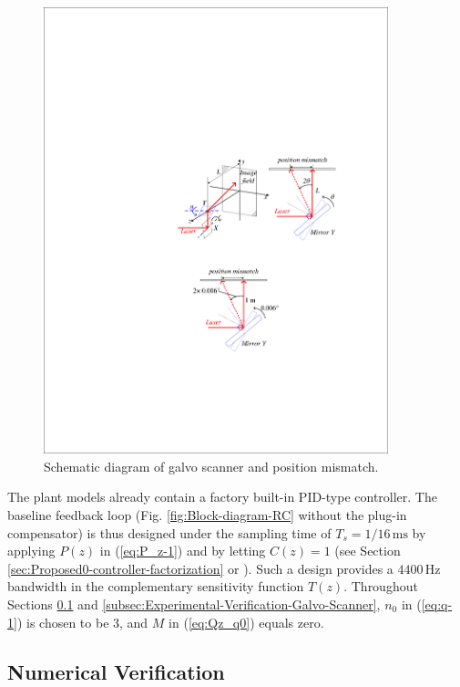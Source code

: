 \documentclass [11pt, proquest] {uwthesis}[2020/02/24]
\begin{document}
\begin{figure}[!ht]
\begin{centering}
\includegraphics[width=10cm]{Fractional-order-RC/laser scanning mirror rotation}
\par\end{centering}
\caption{\label{fig:Schematic-diagram-of}Schematic diagram of galvo scanner
and position mismatch.}
\end{figure}

The plant models already contain a factory built-in PID-type controller.
The baseline feedback loop (Fig. \ref{fig:Block-diagram-RC} without
the plug-in compensator) is thus designed under the sampling time
of $T_{s}=1/16\,\text{ms}$ by applying $P(z)$ in (\ref{eq:P_z-1})
and by letting $C(z)=1$ (see Section \ref{sec:Proposed0-controller-factorization} or \cite{wang2017tutorial}). Such a design
provides a $4400\,\text{Hz}$ bandwidth in the complementary sensitivity
function $T(z)$. Throughout Sections \ref{subsec:Numerical-Verification-Galvo-Scanner}
and \ref{subsec:Experimental-Verification-Galvo-Scanner}, $n_{0}$ in (\ref{eq:q-1})
is chosen to be 3, and $M$ in (\ref{eq:Qz_q0}) equals zero.

\subsection{Numerical Verification} \label{subsec:Numerical-Verification-Galvo-Scanner}
\end{document}

